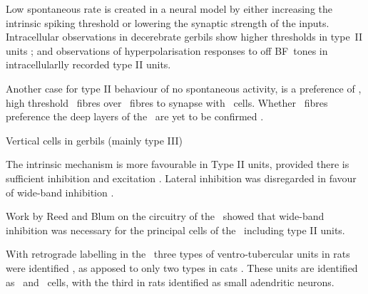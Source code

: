 Low spontaneous rate is created in a neural model by either increasing the
intrinsic spiking threshold or lowering the synaptic strength of the
inputs. Intracellular observations in decerebrate gerbils show higher thresholds
in type~II units \citep{DingVoigt:1997}; and observations of hyperpolarisation
responses to off \gls{BF}~tones in intracellularlly recorded type II units.


Another case for type II behaviour of no spontaneous activity, is a preference
of \LSR, high threshold \AN~fibres over \HSR~fibres to synapse with
\TV~cells. Whether \LSR~fibres preference the deep layers of the \CN~are yet to
be confirmed
\citep{Ryugo:2008,MeltzerRyugo:2006,RyugoParks:2003,BabalianJacommeEtAl:2002}.

\smallskip{}

\citep{Rhode:1999} Vertical cells in gerbils (mainly type III)

\smallskip{}

The intrinsic mechanism is more favourable in Type II units, provided there is
sufficient inhibition and excitation \citep{HancockDavisEtAl:1997}. Lateral
inhibition was disregarded in favour of wide-band inhibition
\citep{HancockDavisEtAl:1997}.

\smallskip{}

Work by Reed and Blum
\citep{ReedBlum:1995,BlumReedEtAl:1995,ReedBlum:1997,BlumReed:1998} on the
circuitry of the \DCN~showed that wide-band inhibition was necessary for the
principal cells of the \DCN~including type II units.

\smallskip{}

With retrograde labelling in the \DCN~three types of ventro-tubercular units in
rats were identified \citet{FriedlandPongstapornEtAl:2003}, as apposed to only
two types in cats \citep{SmithRhode:1989,OertelWuEtAl:1990}. These units are
identified as \TS~and \DS~cells, with the third in rats identified as small
adendritic neurons.


\smallskip{}








